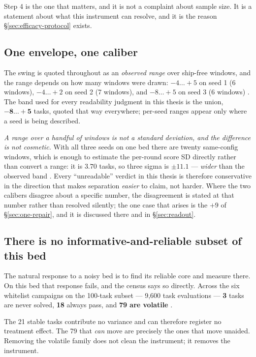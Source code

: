 Step 4 is the one that matters, and it is not a complaint about sample
size. It is a statement about what this instrument can resolve, and it is
the reason \S\ref{sec:efficacy-protocol} exists.

\subsection*{One envelope, one caliber}

The swing is quoted throughout as an \emph{observed range} over ship-free
windows, and the range depends on how many windows were drawn:
$-4\ldots{+}5$ on seed 1 (6 windows), $-4\ldots{+}2$ on seed 2 (7
windows), and $-8\ldots{+}5$ on seed 3 (6 windows) .
The band used for every readability judgment in this thesis is the union,
$\mathbf{-8\ldots{+}5}$ tasks, quoted that way everywhere; per-seed
ranges appear only where a seed is being described.

\emph{A range over a handful of windows is not a standard deviation, and
the difference is not cosmetic.} With all three seeds on one bed there are
twenty same-config windows, which is enough to estimate the per-round score
SD directly rather than convert a range: it is $\mathbf{3.70}$ tasks, so
three sigma is $\pm 11.1$ --- \emph{wider} than the observed band
. Every ``unreadable'' verdict in this thesis is therefore
conservative in the direction that makes separation \emph{easier} to
claim, not harder.
Where the two calibers disagree about a specific number, the disagreement
is stated at that number rather than resolved silently; the one case that
arises is the $+9$ of \S\ref{sec:one-repair}, and it is discussed there and
in \S\ref{sec:readout}.

\subsection*{There is no informative-and-reliable subset of this bed}

The natural response to a noisy bed is to find its reliable core and
measure there. On this bed that response fails, and the census says so
directly. Across the six whitelist campaigns on the 100-task subset ---
9{,}600 task evaluations --- \textbf{3} tasks are never solved,
\textbf{18} always pass, and \textbf{79 are volatile} .

The 21 stable tasks contribute no variance and can therefore register no
treatment effect. The 79 that \emph{can} move are precisely the ones that
move unaided. Removing the volatile family does not clean the instrument;
it removes the instrument.

